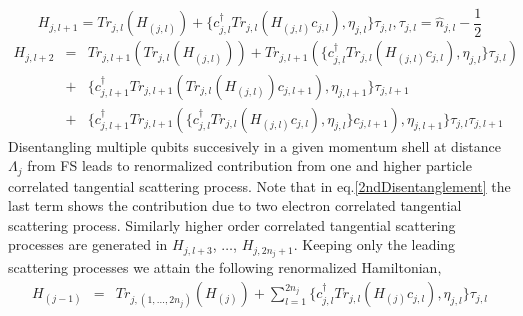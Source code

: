 \documentclass[aps,prl,preprint,groupedaddress]{revtex4-2}
\begin{document}
\begin{equation}
H_{j,l+1}=Tr_{j,l}(H_{(j,l)})+\lbrace c^{\dagger}_{j,l}Tr_{j,l}(H_{(j,l)}c_{j,l}),\eta_{j,l}\rbrace\tau_{j,l}, \tau_{j,l}=\hat{n}_{j,l}-\frac{1}{2} 
\end{equation}
\begin{eqnarray}
H_{j,l+2}&=&Tr_{j,l+1}(Tr_{j,l}(H_{(j,l)}))+Tr_{j,l+1}(\lbrace c^{\dagger}_{j,l}Tr_{j,l}(H_{(j,l)}c_{j,l}),\eta_{j,l}\rbrace\tau_{j,l})\nonumber\\
&+&\lbrace c^{\dagger}_{j,l+1}Tr_{j,l+1}(Tr_{j,l}(H_{(j,l)})c_{j,l+1}),\eta_{j,l+1}\rbrace\tau_{j,l+1}\nonumber\\
&+&\lbrace c^{\dagger}_{j,l+1}Tr_{j,l+1}(\lbrace c^{\dagger}_{j,l}Tr_{j,l}(H_{(j,l)}c_{j,l}),\eta_{j,l}\rbrace c_{j,l+1}),\eta_{j,l+1}\rbrace\tau_{j,l}\tau_{j,l+1}\label{2ndDisentanglement}
\end{eqnarray}
Disentangling multiple qubits succesively in a given momentum shell at distance $\Lambda_{j}$ from FS leads to renormalized contribution from one and higher  particle correlated tangential scattering process. Note that in eq.\eqref{2ndDisentanglement} the last term shows the contribution due to two electron correlated tangential scattering process. Similarly higher order correlated tangential scattering processes are generated in $H_{j,l+3}$, $\ldots$, $H_{j,2n_{j}+1}$. Keeping only the leading scattering processes we attain the following renormalized Hamiltonian,
\begin{eqnarray}
H_{(j-1)}&=&Tr_{j,(1,\ldots,2n_{j})}(H_{(j)})+\sum_{l=1}^{2n_{j}}\lbrace c^{\dagger}_{j,l}Tr_{j,l}(H_{(j)}c_{j,l}),\eta_{j,l}\rbrace\tau_{j,l}
\end{eqnarray}
\end{document}
